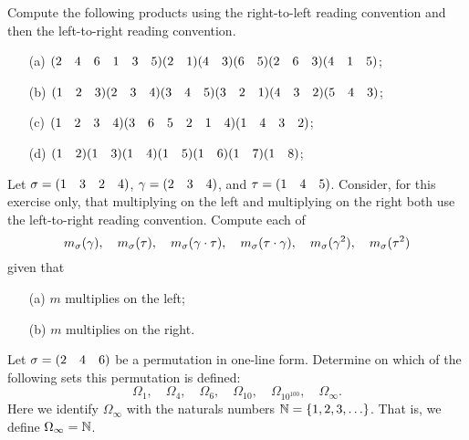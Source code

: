 \begin{exercise}\label{ex:ch1-rtl&ltr}
    Compute the following products using the right-to-left reading convention and then the left-to-right reading convention.
    \vspace*{-10pt}
    \begin{itemize}[nolistsep]
        \item[(a)] \q$(2 \quad 4 \quad 6 \quad 1 \quad 3 \quad 5)(2 \quad 1)(4 \quad 3)(6 \quad 5)(2 \quad 6 \quad 3)(4 \quad 1 \quad 5)$;
        \item[(b)] \q$(1 \quad 2 \quad 3)(2 \quad 3 \quad 4)(3 \quad 4 \quad 5)(3 \quad 2 \quad 1)(4 \quad 3 \quad 2)(5 \quad 4 \quad 3)$;
        \item[(c)] \q$(1 \quad 2 \quad 3 \quad 4)(3 \quad 6 \quad 5 \quad 2 \quad 1 \quad 4)(1 \quad 4 \quad 3 \quad 2)$;
        \item[(d)] \q$(1 \quad 2)(1 \quad 3)(1 \quad 4)(1 \quad 5)(1 \quad 6)(1 \quad 7)(1 \quad 8)$;
    \end{itemize}
\end{exercise}

\begin{exercise}\label{ex:ch1-ltronly}
    Let $\sigma = (1 \quad 3 \quad 2 \quad 4)$, $\gamma = (2 \quad 3 \quad 4)$, and $\tau = (1 \quad 4 \quad 5)$. Consider, for this exercise only, that multiplying on the left and multiplying on the right both use the left-to-right reading convention. Compute each of
    \[
    m_{\sigma}(\gamma),\quad m_{\sigma}(\tau),\quad m_{\sigma}(\gamma\cdot\tau),\quad m_{\sigma}(\tau\cdot\gamma),\quad m_{\sigma}(\gamma^{2}),\quad m_{\sigma}(\tau^{2})
    \]
    given that
    \vspace*{-10pt}
    \begin{itemize}[nolistsep]
        \item[(a)] $m$ multiplies on the left;
        \item[(b)] $m$ multiplies on the right.
    \end{itemize}
\end{exercise}

\begin{exercise}\label{ex:ch1-omegainfty}
    Let $\sigma = (2 \quad 4 \quad 6)$ be a permutation in one-line form. Determine on which of the following sets this permutation is defined:
    \[
    \Omega_{1},\quad \Omega_{4},\quad \Omega_{6},\quad \Omega_{10},\quad \Omega_{10^{100}},\quad \Omega_{\infty}.
    \]
    Here we identify $\Omega_{\infty}$ with the naturals numbers $\mathbb{N} = \{1, 2, 3, \ldots\}$. That is, we define $\Omega_{\infty} = \mathbb{N}$.
\end{exercise}

